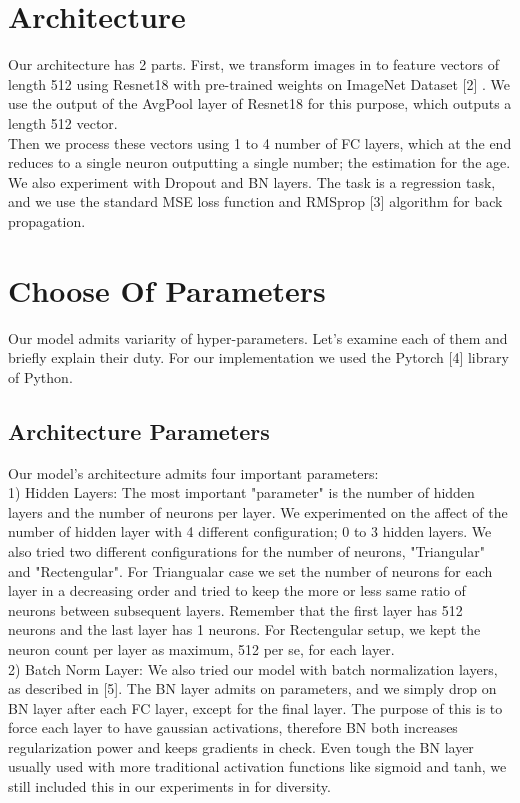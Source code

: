 \documentclass[conference,compsoc]{IEEEtran}
\begin{document}
\section{Architecture}
Our architecture has 2 parts. First, we transform images in to feature vectors of length 512 using Resnet18 with pre-trained weights on ImageNet Dataset [2] . We use the output of the AvgPool layer of Resnet18 for this purpose, which outputs a length 512 vector. 
\\

Then we process these vectors using 1 to 4 number of FC layers, which at the end reduces to a single neuron outputting a single number; the estimation for the age. We also experiment with Dropout and BN layers. The task is a regression task, and we use the standard MSE loss function and RMSprop [3] algorithm for back propagation. 

\section{Choose Of Parameters}

Our model admits variarity of hyper-parameters. Let's examine each of them and briefly explain their duty. For our implementation we used the Pytorch [4] library of Python. 

\subsection{Architecture Parameters}

Our model's architecture admits four important parameters:\\

1) Hidden Layers: The most important "parameter" is the number of hidden layers and the number of neurons per layer. We experimented on the affect of the number of hidden layer with 4 different configuration; 0 to 3 hidden layers. We also tried two different configurations for the number of neurons, "Triangular" and "Rectengular". For Triangualar case we set the number of neurons for each layer in a decreasing order and tried to keep the more or less same ratio of neurons between subsequent layers. Remember that the first layer has 512 neurons and the last layer has 1 neurons. For Rectengular setup, we kept the neuron count per layer as maximum, 512 per se, for each layer. \\

2) Batch Norm Layer: We also tried our model with batch normalization layers, as described in [5]. The BN layer admits on parameters, and we simply drop on BN layer after each FC layer, except for the final layer. The purpose of this is to force each layer to have gaussian activations, therefore BN both increases regularization power and keeps gradients in check. Even tough the BN layer usually used with more traditional activation functions like sigmoid and tanh, we still included this in our experiments in for diversity. \\
\end{document}
